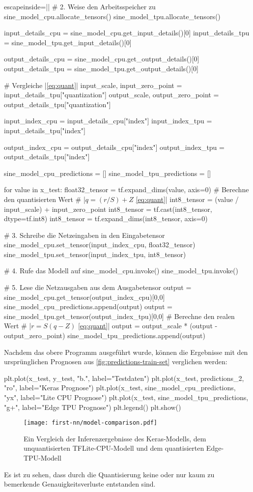 \begin{pythoncode*}{escapeinside=||}
# 2. Weise den Arbeitsspeicher zu
sine_model_cpu.allocate_tensors()
sine_model_tpu.allocate_tensors()

input_details_cpu = sine_model_cpu.get_input_details()[0]
input_details_tpu = sine_model_tpu.get_input_details()[0]

output_details_cpu = sine_model_cpu.get_output_details()[0]
output_details_tpu = sine_model_tpu.get_output_details()[0]

# Vergleiche |\autoref{eq:quant}|
input_scale, input_zero_point = input_details_tpu["quantization"]
output_scale, output_zero_point = output_details_tpu["quantization"]

input_index_cpu = input_details_cpu["index"]
input_index_tpu = input_details_tpu["index"]

output_index_cpu = output_details_cpu["index"]
output_index_tpu = output_details_tpu["index"]

sine_model_cpu_predictions = []
sine_model_tpu_predictions = []

for value in x_test:
    float32_tensor = tf.expand_dims(value, axis=0)
    # Berechne den quantisierten Wert
    # |$q = (r / S) + Z$ \eqref{eq:quant}|
    int8_tensor = (value / input_scale) + input_zero_point
    int8_tensor = tf.cast(int8_tensor, dtype=tf.int8)
    int8_tensor = tf.expand_dims(int8_tensor, axis=0)
    
    # 3. Schreibe die Netzeingaben in den Eingabetensor
    sine_model_cpu.set_tensor(input_index_cpu, float32_tensor)
    sine_model_tpu.set_tensor(input_index_tpu, int8_tensor)

    # 4. Rufe das Modell auf
    sine_model_cpu.invoke()
    sine_model_tpu.invoke()
    
    # 5. Lese die Netzausgaben aus dem Ausgabetensor
    output = sine_model_cpu.get_tensor(output_index_cpu)[0,0]
    sine_model_cpu_predictions.append(output)
    output = sine_model_tpu.get_tensor(output_index_tpu)[0,0]
    # Berechne den realen Wert
    # |$r = S(q - Z)$ \eqref{eq:quant}|
    output = output_scale * (output - output_zero_point) 
    sine_model_tpu_predictions.append(output)
\end{pythoncode*}
Nachdem das obere Programm ausgeführt wurde, können die Ergebnisse
mit den ursprünglichen Prognosen aus \autoref{fig:predictions-train-set}
verglichen werden:
\begin{pythoncode}
plt.plot(x_test, y_test, "b.", label="Testdaten")
plt.plot(x_test, predictions_2, "ro", label="Keras Prognose")
plt.plot(x_test, sine_model_cpu_predictions, "yx", label="Lite CPU Prognose")
plt.plot(x_test, sine_model_tpu_predictions, "g+", label="Edge TPU Prognose")
plt.legend()
plt.show()
\end{pythoncode}
\begin{figure}[h!]
  \centering
  \texttt{[image: first-nn/model-comparison.pdf]}
  \caption{Ein Vergleich der Inferenzergebnisse des Keras-Modells, dem unquantisierten
  TFLite-CPU-Modell und dem quantisierten Edge-TPU-Modell}
  \label{fig:model-comparison}
\end{figure}
Es ist zu sehen, dass durch die Quantisierung keine oder nur kaum
zu bemerkende Genauigkeitsverluste entstanden sind.


